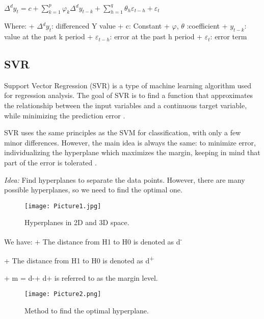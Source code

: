 \documentclass{ieeeojies}
\begin{document}
$\Delta{^d}y_t=c+\sum_{k=1}^{p}\varphi_k\Delta{^d}y_{t-k}+\sum_{h=1}^{q}\theta_h\varepsilon_{t-h}+\varepsilon_t$ \newline

\newline Where:
\newline + $\Delta{^d}y_t$: differenced Y value
\newline + c: Constant
\newline +	$\varphi$, $\theta$ :coefficient
\newline +	$y_{t-k}$: value at the past k period
\newline +	$\varepsilon_{t-h}$: error at the past h period
\newline +	$\varepsilon_t$: error term

\subsection{SVR}
\hspace{0.4cm}Support Vector Regression (SVR) is a type of machine learning algorithm used for regression analysis. The goal of SVR is to find a function that approximates the relationship between the input variables and a continuous target variable, while minimizing the prediction error \cite{svr1}. 

SVR uses the same principles as the SVM for classification, with only a few minor differences. However, the main idea is always the same: to minimize error, individualizing the hyperplane which maximizes the margin, keeping in mind that part of the error is tolerated \cite{svr2}. 


\textit{Idea:} Find hyperplanes to separate the data points. However, there are many possible hyperplanes, so we need to find the optimal one. 


\begin{figure}[h]
    \centering
    \texttt{[image: Picture1.jpg]}
    \caption {\centering Hyperplanes in 2D and 3D space.}
    \label{fig:enter-label}
\end{figure}


We have:\newline
\hspace{0.4cm}+ The distance from H1 to H0 is denoted as d\textsuperscript{-}

+ The distance from H1 to H0 is denoted as d\textsuperscript{+}

+ m = d-+ d+ is referred to as the margin level.

\begin{figure}[h]
    \centering
    \texttt{[image: Picture2.png]}
    \caption{\centering Method to find the optimal hyperplane.}
    \label{fig:enter-label}
\end{figure}
\end{document}
